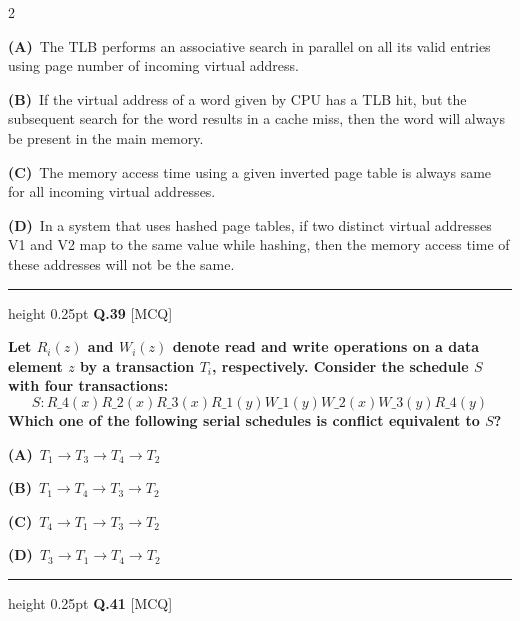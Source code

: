\documentclass[a4paper,10pt,twoside]{article}
\begin{document}
\begin{multicols}{2}
\par\vspace{2pt}\noindent
\textbf{(A)}~The TLB performs an associative search in parallel on all its valid entries using page number of incoming virtual address.\par\vspace{2pt}\noindent
\textbf{(B)}~If the virtual address of a word given by CPU has a TLB hit, but the subsequent search for the word results in a cache miss, then the word will always be present in the main memory.\par\vspace{2pt}\noindent
\textbf{(C)}~The memory access time using a given inverted page table is always same for all incoming virtual addresses.\par\vspace{2pt}\noindent
\textbf{(D)}~In a system that uses hashed page tables, if two distinct virtual addresses V1 and V2 map to the same value while hashing, then the memory access time of these addresses will not be the same.
\par\vspace{6pt}\hrule height 0.25pt\vspace{6pt}
\noindent\textbf{Q.39} \hfill {\footnotesize\textsf{[MCQ]}}
\par\vspace{2pt}
{\bfseries Let $R_i(z)$ and $W_i(z)$ denote read and write operations on a data element $z$ by a transaction $T_i$, respectively. Consider the schedule $S$ with four transactions:
\[ S: R\_4(x) R\_2(x) R\_3(x) R\_1(y) W\_1(y) W\_2(x) W\_3(y) R\_4(y) \]
Which one of the following serial schedules is conflict equivalent to $S$? \par}
\par\vspace{2pt}\noindent
\textbf{(A)}~$T_1 \to T_3 \to T_4 \to T_2$\par\vspace{2pt}\noindent
\textbf{(B)}~$T_1 \to T_4 \to T_3 \to T_2$\par\vspace{2pt}\noindent
\textbf{(C)}~$T_4 \to T_1 \to T_3 \to T_2$\par\vspace{2pt}\noindent
\textbf{(D)}~$T_3 \to T_1 \to T_4 \to T_2$
\par\vspace{6pt}\hrule height 0.25pt\vspace{6pt}
\noindent\textbf{Q.41} \hfill {\footnotesize\textsf{[MCQ]}}

\end{multicols}
\end{document}
